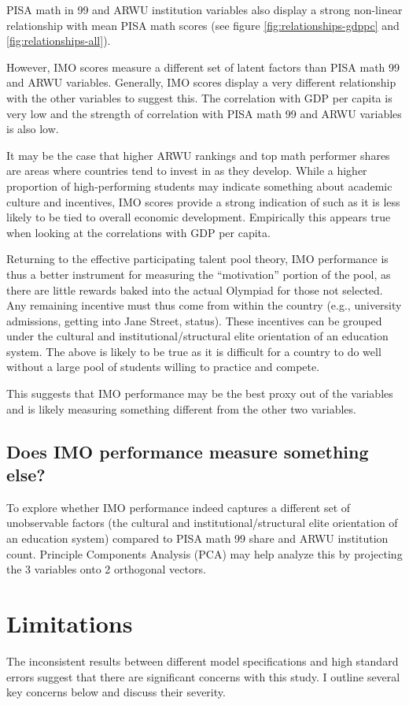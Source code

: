 \documentclass[11pt]{article}
\begin{document}
PISA math in 99 and ARWU institution variables also display a strong non-linear relationship with mean PISA math scores (see figure \ref{fig:relationships-gdppc} and \ref{fig:relationships-all}).

However, IMO scores measure a different set of latent factors than PISA math 99 and ARWU variables. Generally, IMO scores display a very different relationship with the other variables to suggest this. The correlation with GDP per capita is very low and the strength of correlation with PISA math 99 and ARWU variables is also low.

It may be the case that higher ARWU rankings and top math performer shares are areas where countries tend to invest in as they develop. While a higher proportion of high-performing students may indicate something about academic culture and incentives, IMO scores provide a strong indication of such as it is less likely to be tied to overall economic development. Empirically this appears true when looking at the correlations with GDP per capita.

Returning to the effective participating talent pool theory, IMO performance is thus a better instrument for measuring the “motivation” portion of the pool, as there are little rewards baked into the actual Olympiad for those not selected. Any remaining incentive must thus come from within the country (e.g., university admissions, getting into Jane Street, status). These incentives can be grouped under the cultural and institutional/structural elite orientation of an education system. The above is likely to be true as it is difficult for a country to do well without a large pool of students willing to practice and compete.

This suggests that IMO performance may be the best proxy out of the variables and is likely measuring something different from the other two variables.

\subsection{Does IMO performance measure something else?}
To explore whether IMO performance indeed captures a different set of unobservable factors (the cultural and institutional/structural elite orientation of an education system) compared to PISA math 99 share and ARWU institution count. Principle Components Analysis (PCA) may help analyze this by projecting the 3 variables onto 2 orthogonal vectors.

\section{Limitations}
The inconsistent results between different model specifications and high standard errors suggest that there are significant concerns with this study. I outline several key concerns below and discuss their severity.
\end{document}
